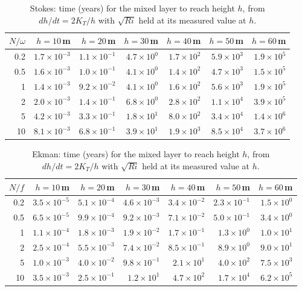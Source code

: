\begin{table}[h]
\centering
\caption{Stokes: time (years) for the mixed layer to reach height $h$, from $dh/dt = 2K_T/h$ with $\sqrt{Ri}$ held at its measured value at $h$.}
\begin{tabular}{rrrrrrr}
\hline
$N/\omega$ & $h = 10$\,m & $h = 20$\,m & $h = 30$\,m & $h = 40$\,m & $h = 50$\,m & $h = 60$\,m \\
\hline
0.2 & $1.7\times10^{-3}$ & $1.1\times10^{-1}$ & $4.7\times10^{0}$ & $1.7\times10^{2}$ & $5.9\times10^{3}$ & $1.9\times10^{5}$ \\
0.5 & $1.6\times10^{-3}$ & $1.0\times10^{-1}$ & $4.1\times10^{0}$ & $1.4\times10^{2}$ & $4.7\times10^{3}$ & $1.5\times10^{5}$ \\
1 & $1.4\times10^{-3}$ & $9.2\times10^{-2}$ & $4.1\times10^{0}$ & $1.6\times10^{2}$ & $5.6\times10^{3}$ & $1.9\times10^{5}$ \\
2 & $2.0\times10^{-3}$ & $1.4\times10^{-1}$ & $6.8\times10^{0}$ & $2.8\times10^{2}$ & $1.1\times10^{4}$ & $3.9\times10^{5}$ \\
5 & $4.2\times10^{-3}$ & $3.3\times10^{-1}$ & $1.8\times10^{1}$ & $8.0\times10^{2}$ & $3.4\times10^{4}$ & $1.4\times10^{6}$ \\
10 & $8.1\times10^{-3}$ & $6.8\times10^{-1}$ & $3.9\times10^{1}$ & $1.9\times10^{3}$ & $8.5\times10^{4}$ & $3.7\times10^{6}$ \\
\hline
\end{tabular}
\end{table}

\begin{table}[h]
\centering
\caption{Ekman: time (years) for the mixed layer to reach height $h$, from $dh/dt = 2K_T/h$ with $\sqrt{Ri}$ held at its measured value at $h$.}
\begin{tabular}{rrrrrrr}
\hline
$N/f$ & $h = 10$\,m & $h = 20$\,m & $h = 30$\,m & $h = 40$\,m & $h = 50$\,m & $h = 60$\,m \\
\hline
0.2 & $3.5\times10^{-5}$ & $5.1\times10^{-4}$ & $4.6\times10^{-3}$ & $3.4\times10^{-2}$ & $2.3\times10^{-1}$ & $1.5\times10^{0}$ \\
0.5 & $6.5\times10^{-5}$ & $9.9\times10^{-4}$ & $9.2\times10^{-3}$ & $7.1\times10^{-2}$ & $5.0\times10^{-1}$ & $3.4\times10^{0}$ \\
1 & $1.1\times10^{-4}$ & $1.8\times10^{-3}$ & $1.9\times10^{-2}$ & $1.7\times10^{-1}$ & $1.3\times10^{0}$ & $1.0\times10^{1}$ \\
2 & $2.5\times10^{-4}$ & $5.5\times10^{-3}$ & $7.4\times10^{-2}$ & $8.5\times10^{-1}$ & $8.9\times10^{0}$ & $9.0\times10^{1}$ \\
5 & $1.0\times10^{-3}$ & $4.0\times10^{-2}$ & $9.8\times10^{-1}$ & $2.1\times10^{1}$ & $4.0\times10^{2}$ & $7.5\times10^{3}$ \\
10 & $3.5\times10^{-3}$ & $2.5\times10^{-1}$ & $1.2\times10^{1}$ & $4.7\times10^{2}$ & $1.7\times10^{4}$ & $6.2\times10^{5}$ \\
\hline
\end{tabular}
\end{table}
